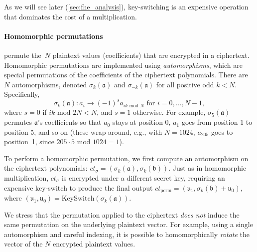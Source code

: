 As we will see later (\autoref{sec:fhe_analysis}), key-switching is an
expensive operation that dominates the cost of a multiplication.

\paragraph{Homomorphic permutations} permute the~$N$ plaintext values
(coefficients) that are encrypted in a ciphertext.
Homomorphic permutations are implemented using \emph{automorphisms},
which are special permutations of the coefficients of the ciphertext
polynomials.  There are~$N$ automorphisms, denoted
$\sigma_k(\mathfrak{a})$ and $\sigma_{-k}(\mathfrak{a})$ for all
positive odd $k<N$. Specifically, \vspace{-2pt}
\begin{equation*}
  \sigma_k(\mathfrak{a}): a_i \rightarrow (-1)^{s} a_{ik \textrm{ mod } N} \text{ for } i=0,...,N-1,
\end{equation*}
where $s=0$ if $ik \textrm{ mod } 2N < N$, and $s=1$ otherwise.
For example, $\sigma_{5}(\mathfrak{a})$ permutes $\mathfrak{a}$'s coefficients so that 
$a_0$ stays at position 0, $a_1$ goes from position 1 to position 5, and so on (these wrap around, e.g., with $N=1024$,
$a_{205}$ goes to position~1, since $205\cdot5 \textrm{ mod } 1024 = 1$).

To perform a homomorphic permutation, we first compute an automorphism on the ciphertext polynomials:
$ct_{\sigma} = (\sigma_k(\mathfrak{a}), \sigma_k(\mathfrak{b}))$.
Just as in homomorphic multiplication, $ct_{\sigma}$ is encrypted
under a different secret key, requiring an expensive key-switch to
produce the final output
$ct_{\text{perm}} = (\mathfrak{u}_1, \sigma_{k}(\mathfrak{b}) +
\mathfrak{u}_0)$, where
$(\mathfrak{u}_1, \mathfrak{u}_0) = \text{KeySwitch}(\sigma_k
(\mathfrak{a}))$.

We stress that the permutation applied to the ciphertext \emph{does
  not} induce the same permutation on the underlying plaintext
vector. For example, using a single automorphism and careful indexing,
it is possible to homomorphically \emph{rotate} the vector of the $N$
encrypted plaintext values.

